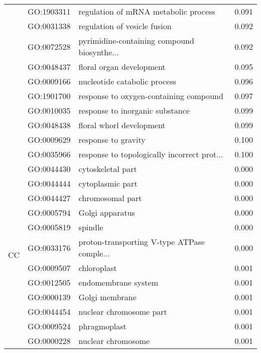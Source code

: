 \begin{longtable}{lllr}
   & GO:1903311 &         regulation of mRNA metabolic process &         0.091 \\
   & GO:0031338 &                 regulation of vesicle fusion &         0.092 \\
   & GO:0072528 &  pyrimidine-containing compound biosynthe... &         0.092 \\
   & GO:0048437 &                     floral organ development &         0.095 \\
   & GO:0009166 &                 nucleotide catabolic process &         0.096 \\
   & GO:1901700 &       response to oxygen-containing compound &         0.097 \\
   & GO:0010035 &              response to inorganic substance &         0.099 \\
   & GO:0048438 &                     floral whorl development &         0.099 \\
   & GO:0009629 &                          response to gravity &         0.100 \\
   & GO:0035966 &  response to topologically incorrect prot... &         0.100 \\
\cline{1-4}
\multirow{68}{*}{CC} & GO:0044430 &                            cytoskeletal part &         0.000 \\
   & GO:0044444 &                             cytoplasmic part &         0.000 \\
   & GO:0044427 &                             chromosomal part &         0.000 \\
   & GO:0005794 &                              Golgi apparatus &         0.000 \\
   & GO:0005819 &                                      spindle &         0.000 \\
   & GO:0033176 &  proton-transporting V-type ATPase comple... &         0.000 \\
   & GO:0009507 &                                  chloroplast &         0.001 \\
   & GO:0012505 &                          endomembrane system &         0.001 \\
   & GO:0000139 &                               Golgi membrane &         0.001 \\
   & GO:0044454 &                      nuclear chromosome part &         0.001 \\
   & GO:0009524 &                                 phragmoplast &         0.001 \\
   & GO:0000228 &                           nuclear chromosome &         0.001 \\

\end{longtable}

